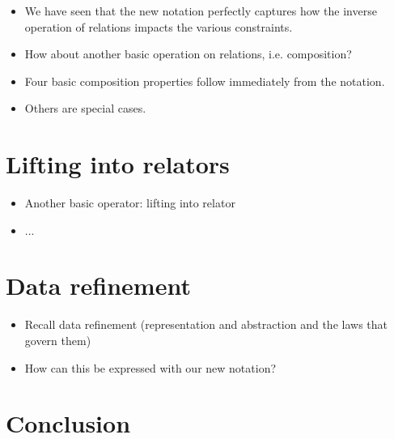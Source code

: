 \documentclass[runningheads,a4paper]{llncs}
\begin{document}
\begin{itemize}
\item We have seen that the new notation perfectly captures how the inverse operation of relations impacts the various constraints.
\item How about another basic operation on relations, i.e. composition?
\item Four basic composition properties follow immediately from the notation.
\item Others are special cases.
\end{itemize}

\section{Lifting into relators}

\begin{itemize}
\item Another basic operator: lifting into relator
\item ...
\end{itemize}

\section{Data refinement}

\begin{itemize}
\item Recall data refinement (representation and abstraction and the laws that govern them)
\item How can this be expressed with our new notation?
\end{itemize}

\section{Conclusion}



\end{document}
